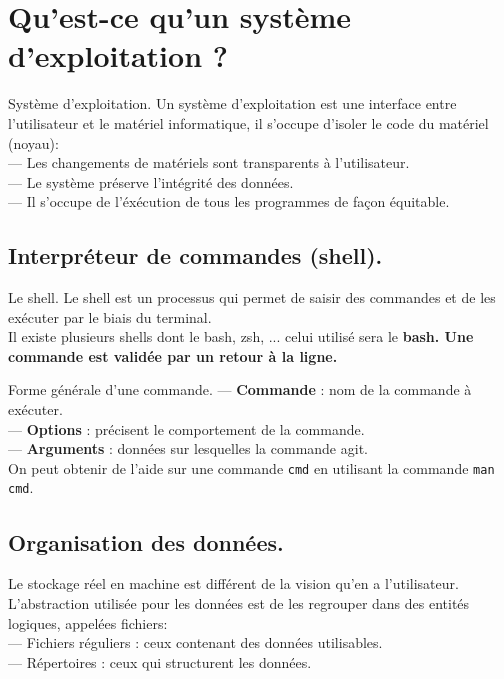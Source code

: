 \documentclass[french, 11pt]{article}
\begin{document}


\section{Qu'est-ce qu'un système d'exploitation ?}

\begin{defi}{Système d'exploitation.}{}
    Un système d'exploitation est une interface entre l'utilisateur et le matériel informatique, il s'occupe d'isoler le code du matériel (noyau):\\
    --- Les changements de matériels sont transparents à l'utilisateur.\\
    --- Le système préserve l'intégrité des données.\\
    --- Il s'occupe de l'éxécution de tous les programmes de façon équitable.
\end{defi}

\subsection{Interpréteur de commandes (shell).}

\begin{defi}{Le shell.}{}
    Le shell est un processus qui permet de saisir des commandes et de les exécuter par le biais du terminal.\\
    Il existe plusieurs shells dont le bash, zsh, ... celui utilisé sera le \bf{bash}.\n
    Une commande est validée par un retour à la ligne.
\end{defi}

\begin{defi}{Forme générale d'une commande.}{}
    --- \textbf{Commande} : nom de la commande à exécuter.\\
    --- \textbf{Options} : précisent le comportement de la commande.\\
    --- \textbf{Arguments} : données sur lesquelles la commande agit.\\
    On peut obtenir de l'aide sur une commande \texttt{cmd} en utilisant la commande \texttt{man cmd}.
\end{defi}

\subsection{Organisation des données.}

\begin{defi}{}{}
    Le stockage réel en machine est différent de la vision qu'en a l'utilisateur.\n
    L'abstraction utilisée pour les données est de les regrouper dans des entités logiques, appelées fichiers:\\
    --- Fichiers réguliers : ceux contenant des données utilisables.\\
    --- Répertoires : ceux qui structurent les données.
\end{defi}
\end{document}
